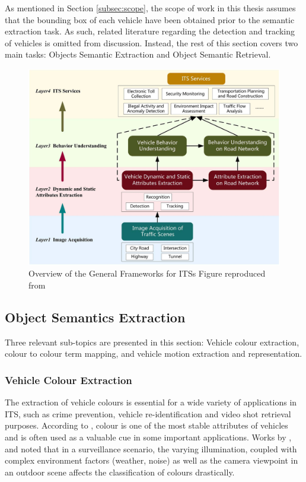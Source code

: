 As mentioned in Section \ref{subsec:scope}, the scope of work in this thesis assumes that the
bounding box of each vehicle have been obtained prior to the semantic
extraction task. As such, related literature regarding the detection and tracking of
vehicles is omitted from discussion. Instead, the rest of this section covers two main tasks: Objects Semantic Extraction and Object Semantic Retrieval.


\begin{figure}[hbt!]\centering
 \includegraphics[width=1\textwidth]{image/lit/ITS.png}
 \caption[Overview of the General Frameworks for ITSs]{Overview of the General Frameworks for ITSs 
 Figure reproduced
 from~}
 \label{fig:ITSoverview}
\end{figure}


\vspace{1em}
\subsection{Object Semantics Extraction}

Three relevant sub-topics are presented in this section: Vehicle colour extraction, colour to colour term mapping, and vehicle motion extraction and representation.

\vspace{1em}
\subsubsection{Vehicle Colour Extraction}
The extraction of vehicle colours is essential for a wide variety of
applications in ITS, such as crime prevention, vehicle re-identification and video shot retrieval purposes.
According to , colour is one of the
most stable attributes of vehicles and is often used as a valuable cue in some
important applications. Works by ,  and
 noted that in a surveillance scenario, the varying
illumination, coupled with complex environment factors (weather, noise) as well as the camera viewpoint in an outdoor scene affects the classification of colours drastically. 


